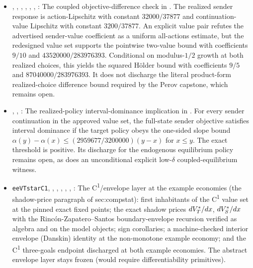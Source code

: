 \begin{itemize}[leftmargin=1.4em,itemsep=1pt]
\item {}, , , , , , : The coupled objective-difference check in . The realized sender response is action-Lipschitz with constant \(32000/37877\) and continuation-value Lipschitz with constant \(3200/37877\). An explicit value pair refutes the advertised sender-value coefficient as a uniform all-actions estimate, but the redesigned value set supports the pointwise two-value bound with coefficients \(9/10\) and \(43520000/283976393\). Conditional on modulus-\(1/2\) growth at both realized choices, this yields the squared H\"older bound with coefficients \(9/5\) and \(87040000/283976393\). It does not discharge the literal product-form realized-choice difference bound required by the Perov capstone, which remains open.
\item {}, , : The realized-policy interval-dominance implication in . For every sender continuation in the approved value set, the full-state sender objective satisfies interval dominance if the target policy obeys the one-sided slope bound \(\alpha(y)-\alpha(x)\le(2959677/3200000)(y-x)\) for \(x\le y\). The exact threshold is positive. Its discharge for the endogenous equilibrium policy remains open, as does an unconditional explicit low-\(\delta\) coupled-equilibrium witness.
\item \texttt{eeVTstarC1}, , , , , , : The C\textsuperscript{1}/envelope layer at the example economies (the shadow-price paragraph of sec:compstat): first inhabitants of the C\textsuperscript{1} value set at the pinned exact fixed points; the exact shadow prices $dV_T^{\ast}/dx$, $dV_S^{\ast}/dx$ with the Rinc\'on-Zapatero--Santos boundary-envelope recursion verified as algebra and on the model objects; sign corollaries; a machine-checked interior envelope (Danskin) identity at the non-monotone example economy; and the C\textsuperscript{1} three-goals endpoint discharged at both example economies. The abstract envelope layer stays frozen (would require differentiability primitives).

\end{itemize}
